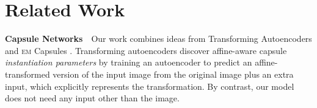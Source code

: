 




%

\vspace{-1pt}
\section{Related Work}
\label{sec:related_work}\vspace{-5pt}

\textbf{Capsule Networks}\ \ 
Our work combines ideas from Transforming Autoencoders \citep{Hinton2011tae} and \textsc{em} Capsules \citep{Hinton2018capsule}.
Transforming autoencoders discover affine-aware capsule \textit{instantiation parameters} by training an autoencoder to predict an affine-transformed version of the input image from the original image plus an extra input, which explicitly represents the transformation.
By contrast, our model does not need any input other than the image.

